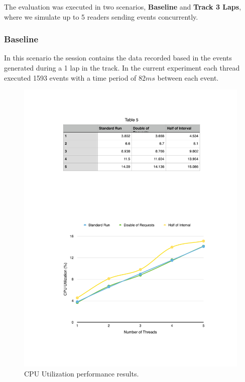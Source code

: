 The evaluation was executed in two scenarios, \textbf{Baseline} and \textbf{Track 3 Laps}, where we
simulate up to 5 readers sending events concurrently.

\subsubsection{Baseline}
\label{subs:eval_exp_data_baseline}
In this scenario the session contains the data recorded based in the events generated during a 1 lap
in the track. In the current experiment each thread executed 1593 events with a time period of 82$ms$
between each event.\\

\begin{figure}[ht!]
  \centering
  \includegraphics[width=.7\textwidth]{./images/cpu_1_lap}
  \caption{CPU Utilization performance results.}
  \label{fig:eval_baseline_cpu}
\end{figure}


